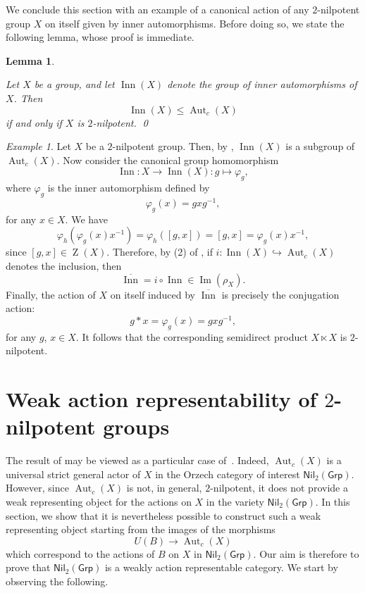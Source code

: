 \documentclass[reqno,hidelinks,a4paper]{amsart}
\theoremstyle{plain}
\newtheorem{lemma}[subsection]{Lemma}
\theoremstyle{definition}
\theoremstyle{remark}
\newtheorem{example}[subsection]{Example}
\numberwithin{equation}{section}
\newcommand{\noproof}{\hfil\qed}
\DeclareMathOperator{\bZ}{Z}
\DeclareMathOperator{\Aut}{Aut}
\DeclareMathOperator{\Imm}{Im}
\DeclareMathOperator{\Inn}{Inn}
\newcommand{\Grp}{\ensuremath{\mathsf{Grp}}}
\newcommand{\Nil}{\ensuremath{\mathsf{Nil}}}
\begin{document}
We conclude this section with an example of a canonical action of any \(2\)-nilpotent group \(X\) on itself given by inner automorphisms. Before doing so, we state the following lemma, whose proof is immediate.

\begin{lemma}\label{lemma}

    Let \(X\) be a group, and let \(\Inn(X)\) denote the group of \emph{inner automorphisms} of \(X\). Then
    \[
        \Inn(X) \leq \Aut_c(X)
    \]
    if and only if \(X\) is \(2\)-nilpotent. \noproof
\end{lemma}

\begin{example}
    Let \(X\) be a \(2\)-nilpotent group. Then, by , \(\Inn(X)\) is a subgroup of \(\Aut_c(X)\). %
    Now consider the canonical group homomorphism
    \[
        \Inn \colon X \to \Inn(X) \colon g \mapsto \varphi_g,
    \]
    where \(\varphi_g\)  is the inner automorphism defined by
    \[
        \varphi_g(x)=gxg^{-1},
    \]
    for any \(x \in X\). We have
    \[
        \varphi_h(\varphi_g(x)x^{-1})=\varphi_h([g,x])=[g,x]=\varphi_g(x)x^{-1},
    \]
    since \([g,x] \in \bZ(X)\). Therefore, by (2) of , if \(i \colon \Inn(X) \hookrightarrow \Aut_c(X)\) denotes the inclusion, then
    \[
        \overline{\Inn} = i \circ \Inn \in \Imm(\rho_X).
    \]
    Finally, the action of \(X\) on itself induced by \(\overline{\Inn}\) is precisely the conjugation action:
    \[
        g \ast x = \varphi_g(x)=gxg^{-1},
    \]
    for any \(g\), \(x \in X\). It follows that the corresponding semidirect product \(X \ltimes X\) is \(2\)-nilpotent.
\end{example}

\section{Weak action representability of \texorpdfstring{\(2\)}{2}-nilpotent groups}\label{sec_rep}

The result of  may be viewed as a particular case of~\cite[Corollary~4.2]{CigoliManciniMetere}. Indeed, \(\Aut_c(X)\) is a universal strict general actor of \(X\) in the Orzech category of interest \(\Nil_2(\Grp)\). However, since \(\Aut_c(X)\) is not, in general, \(2\)-nilpotent, it does not provide a weak representing object for the actions on \(X\) in the variety \(\Nil_2(\Grp)\). In this section, we show that it is nevertheless possible to construct such a weak representing object starting from the images of the morphisms
\[
    U(B) \to \Aut_c(X)
\]
which correspond to the actions of \(B\) on \(X\) in \(\Nil_2(\Grp)\). Our aim is therefore to prove that \(\Nil_2(\Grp)\) is a weakly action representable category. We start by observing the following.
\end{document}
